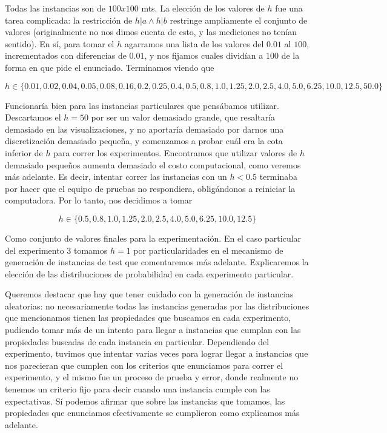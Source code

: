 Todas las instancias son de $100x100$ mts. La elección de los valores de $h$ fue una tarea complicada: la restricción de $h | a \wedge h | b$ restringe ampliamente el conjunto de valores (originalmente no nos dimos cuenta de esto, y las mediciones no tenían sentido). En sí, para tomar el $h$ agarramos una lista de los valores del $0.01$ al $100$, incrementados con diferencias de $0.01$, y nos fijamos cuales dividían a $100$ de la forma en que pide el enunciado. Terminamos viendo que

$$h \in \{0.01, 0.02, 0.04, 0.05, 0.08, 0.16, 0.2, 0.25, 0.4, 0.5, 0.8, 1.0, 1.25, 2.0, 2.5, 4.0, 5.0, 6.25, 10.0, 12.5, 50.0\}$$

Funcionaría bien para las instancias particulares que pensábamos utilizar. Descartamos el $h = 50$ por ser un valor demasiado grande, que resaltaría demasiado en las visualizaciones, y no aportaría demasiado por darnos una discretización demasiado pequeña, y comenzamos a probar cuál era la cota inferior de $h$ para correr los experimentos. Encontramos que utilizar valores de $h$ demasiado pequeños aumenta demasiado el costo computacional, como veremos más adelante. Es decir, intentar correr las instancias con un $h < 0.5$ terminaba por hacer que el equipo de pruebas no respondiera, obligándonos a reiniciar la computadora. Por lo tanto, nos decidimos a tomar

$$h \in \{0.5, 0.8, 1.0, 1.25, 2.0, 2.5, 4.0, 5.0, 6.25, 10.0, 12.5\}$$

Como conjunto de valores finales para la experimentación. En el caso particular del experimento 3 tomamos $h = 1$ por particularidades en el mecanismo de generación de instancias de test que comentaremos más adelante. Explicaremos la elección de las distribuciones de probabilidad en cada experimento particular.

Queremos destacar que hay que tener cuidado con la generación de instancias aleatorias: no necesariamente todas las instancias generadas por las distribuciones que mencionamos tienen las propiedades que buscamos en cada experimento, pudiendo tomar más de un intento para llegar a instancias que cumplan con las propiedades buscadas de cada instancia en particular. Dependiendo del experimento, tuvimos que intentar varias veces para lograr llegar a instancias que nos parecieran que cumplen con los criterios que enunciamos para correr el experimento, y el mismo fue un proceso de prueba y error, donde realmente no tenemos un criterio fijo para decir cuando una instancia cumple con las expectativas. Sí podemos afirmar que sobre las instancias que tomamos, las propiedades que enunciamos efectivamente se cumplieron como explicamos más adelante.

